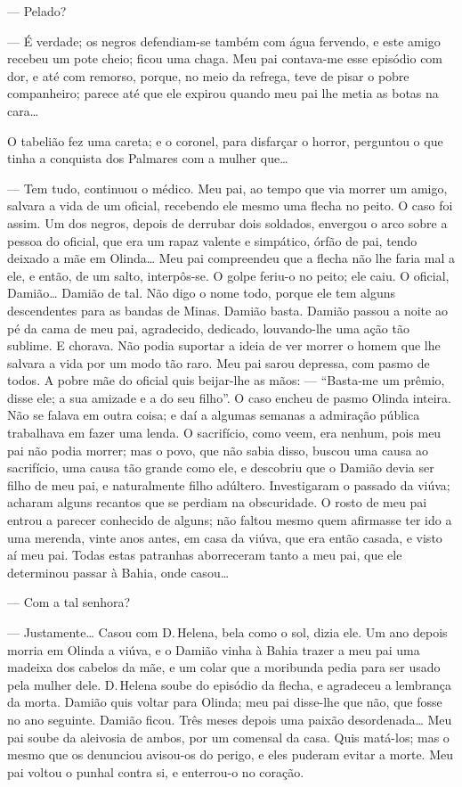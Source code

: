 --- Pelado?

--- É verdade; os negros defendiam-se também com água fervendo, e este
amigo recebeu um pote cheio; ficou uma chaga. Meu pai contava-me esse
episódio com dor, e até com remorso, porque, no meio da refrega, teve de
pisar o pobre companheiro; parece até que ele expirou quando meu pai lhe
metia as botas na cara\ldots{}

O tabelião fez uma careta; e o coronel, para disfarçar o horror,
perguntou o que tinha a conquista dos Palmares com a mulher que\ldots{}

--- Tem tudo, continuou o médico. Meu pai, ao tempo que via morrer um
amigo, salvara a vida de um oficial, recebendo ele mesmo uma flecha no
peito. O caso foi assim. Um dos negros, depois de derrubar dois
soldados, envergou o arco sobre a pessoa do oficial, que era um rapaz
valente e simpático, órfão de pai, tendo deixado a mãe em Olinda\ldots{} Meu
pai compreendeu que a flecha não lhe faria mal a ele, e então, de um
salto, interpôs-se. O golpe feriu-o no peito; ele caiu. O oficial,
Damião\ldots{} Damião de tal. Não digo o nome todo, porque ele tem alguns
descendentes para as bandas de Minas. Damião basta. Damião passou a
noite ao pé da cama de meu pai, agradecido, dedicado, louvando-lhe uma
ação tão sublime. E chorava. Não podia suportar a ideia de ver morrer o
homem que lhe salvara a vida por um modo tão raro. Meu pai sarou
depressa, com pasmo de todos. A pobre mãe do oficial quis beijar-lhe as
mãos: --- ``Basta-me um prêmio, disse ele; a sua amizade e a do seu
filho''. O caso encheu de pasmo Olinda inteira. Não se falava em outra
coisa; e daí a algumas semanas a admiração pública trabalhava em fazer
uma lenda. O sacrifício, como veem, era nenhum, pois meu pai não podia
morrer; mas o povo, que não sabia disso, buscou uma causa ao sacrifício,
uma causa tão grande como ele, e descobriu que o Damião devia ser filho
de meu pai, e naturalmente filho adúltero. Investigaram o passado da
viúva; acharam alguns recantos que se perdiam na obscuridade. O rosto de
meu pai entrou a parecer conhecido de alguns; não faltou mesmo quem
afirmasse ter ido a uma merenda, vinte anos antes, em casa da viúva, que
era então casada, e visto aí meu pai. Todas estas patranhas aborreceram
tanto a meu pai, que ele determinou passar à Bahia, onde casou\ldots{}

--- Com a tal senhora?

--- Justamente\ldots{} Casou com D.\,Helena, bela como o sol, dizia ele. Um
ano depois morria em Olinda a viúva, e o Damião vinha à Bahia trazer a
meu pai uma madeixa dos cabelos da mãe, e um colar que a moribunda pedia
para ser usado pela mulher dele. D.\,Helena soube do episódio da flecha,
e agradeceu a lembrança da morta. Damião quis voltar para Olinda; meu
pai disse-lhe que não, que fosse no ano seguinte. Damião ficou. Três
meses depois uma paixão desordenada\ldots{} Meu pai soube da aleivosia de
ambos, por um comensal da casa. Quis matá-los; mas o mesmo que os
denunciou avisou-os do perigo, e eles puderam evitar a morte. Meu pai
voltou o punhal contra si, e enterrou-o no coração.

